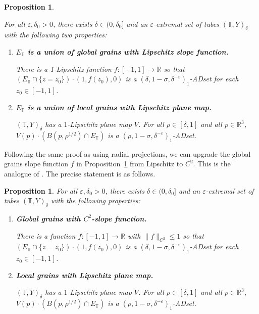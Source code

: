 \documentclass[letterpaper, reqno,11pt]{article}
\numberwithin{equation}{section}
\newcommand{\TT}{\mathbb{T}}
\newcommand{\eps}{\varepsilon}
\numberwithin{thm}{section}
\newtheorem{prop}[thm]{Proposition}
\theoremstyle{remark}
\begin{document}
\begin{prop}\label{prop: grain}


For all $\eps, \delta_0>0$, there exists $\delta\in (0,\delta_0]$ and an $\eps$-extremal set of tubes $(\TT, Y)_{\delta}$ with the following two properties:

\begin{enumerate}
    \item \textbf{ $E_{\TT}$ is a union of global grains with Lipschitz slope function. }

    There is a 1-Lipschitz function $f: [-1,1]\rightarrow \mathbb{R}$ so that $(E_{\TT}\cap \{z=z_0\})\cdot (1, f(z_0), 0)$ is a $(\delta, 1-\sigma, \delta^{-\eps})_1$-ADset for each $z_0\in [-1,1]$. 

    \item \textbf{ $E_{\TT}$ is a union of local grains with Lipschitz plane map. }

    $(\TT, Y)_{\delta}$ has a $1$-Lipschitz plane map $V$. For all $\rho\in [\delta, 1]$ and all $p\in \mathbb{R}^3$, $V(p)\cdot (B(p, \rho^{1/2})\cap E_{\TT})$ is a $(\rho, 1-\sigma, \delta^{-\eps})_1$-ADset. 
\end{enumerate}
\end{prop}


 Following the same proof as \cite[Section 5]{WZ} using radial projections, we can upgrade the global grains slope function $f$ in Proposition~\ref{prop: grain} from Lipschitz to $C^2$. This is the analogue of \cite[Proposition 5.1]{WZ}. The precise statement is as follows.

 \begin{prop}\label{prop: C2}
     For all $\eps, \delta_0>0$, there exists $\delta\in (0,\delta_0]$ and an $\eps$-extremal set of tubes $(\TT, Y)_{\delta}$  with the following properties:
     \begin{enumerate}
         \item[1$'$] \textbf{ Global grains with $C^2$-slope function. }

         There is a function $f: [-1,1]\rightarrow \mathbb{R}$ with $\|f\|_{C^2}\leq 1$ so that $(E_{\TT} \cap \{z=z_0\})\cdot (1, f(z_0), 0)$ is a $(\delta, 1-\sigma, \delta^{-\eps})_1$-ADset for each $z_0 \in [-1,1]$. 
         
         \item[2] \textbf{ Local grains with Lipschitz plane map. }

    $(\TT, Y)_{\delta}$ has a $1$-Lipschitz plane map $V$. For all $\rho\in [\delta, 1]$ and all $p\in \mathbb{R}^3$, $V(p)\cdot (B(p, \rho^{1/2})\cap E_{\TT})$ is a $(\rho, 1-\sigma, \delta^{-\eps})_1$-ADset. 
     \end{enumerate}
 \end{prop}
\end{document}
